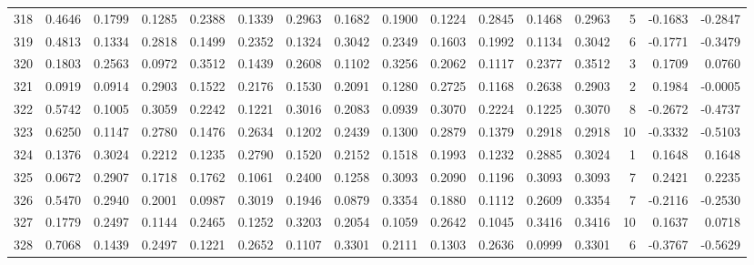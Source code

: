 \begin{tabular}{lrrrrrrrrrrrrrrr}
318 &      0.4646 &  0.1799 &  0.1285 &  0.2388 &  0.1339 &  0.2963 &  0.1682 &  0.1900 &  0.1224 &  0.2845 &   0.1468 &     0.2963 &      5 &                   -0.1683 &                    -0.2847 \\
319 &      0.4813 &  0.1334 &  0.2818 &  0.1499 &  0.2352 &  0.1324 &  0.3042 &  0.2349 &  0.1603 &  0.1992 &   0.1134 &     0.3042 &      6 &                   -0.1771 &                    -0.3479 \\
320 &      0.1803 &  0.2563 &  0.0972 &  0.3512 &  0.1439 &  0.2608 &  0.1102 &  0.3256 &  0.2062 &  0.1117 &   0.2377 &     0.3512 &      3 &                    0.1709 &                     0.0760 \\
321 &      0.0919 &  0.0914 &  0.2903 &  0.1522 &  0.2176 &  0.1530 &  0.2091 &  0.1280 &  0.2725 &  0.1168 &   0.2638 &     0.2903 &      2 &                    0.1984 &                    -0.0005 \\
322 &      0.5742 &  0.1005 &  0.3059 &  0.2242 &  0.1221 &  0.3016 &  0.2083 &  0.0939 &  0.3070 &  0.2224 &   0.1225 &     0.3070 &      8 &                   -0.2672 &                    -0.4737 \\
323 &      0.6250 &  0.1147 &  0.2780 &  0.1476 &  0.2634 &  0.1202 &  0.2439 &  0.1300 &  0.2879 &  0.1379 &   0.2918 &     0.2918 &     10 &                   -0.3332 &                    -0.5103 \\
324 &      0.1376 &  0.3024 &  0.2212 &  0.1235 &  0.2790 &  0.1520 &  0.2152 &  0.1518 &  0.1993 &  0.1232 &   0.2885 &     0.3024 &      1 &                    0.1648 &                     0.1648 \\
325 &      0.0672 &  0.2907 &  0.1718 &  0.1762 &  0.1061 &  0.2400 &  0.1258 &  0.3093 &  0.2090 &  0.1196 &   0.3093 &     0.3093 &      7 &                    0.2421 &                     0.2235 \\
326 &      0.5470 &  0.2940 &  0.2001 &  0.0987 &  0.3019 &  0.1946 &  0.0879 &  0.3354 &  0.1880 &  0.1112 &   0.2609 &     0.3354 &      7 &                   -0.2116 &                    -0.2530 \\
327 &      0.1779 &  0.2497 &  0.1144 &  0.2465 &  0.1252 &  0.3203 &  0.2054 &  0.1059 &  0.2642 &  0.1045 &   0.3416 &     0.3416 &     10 &                    0.1637 &                     0.0718 \\
328 &      0.7068 &  0.1439 &  0.2497 &  0.1221 &  0.2652 &  0.1107 &  0.3301 &  0.2111 &  0.1303 &  0.2636 &   0.0999 &     0.3301 &      6 &                   -0.3767 &                    -0.5629 \\

\end{tabular}
